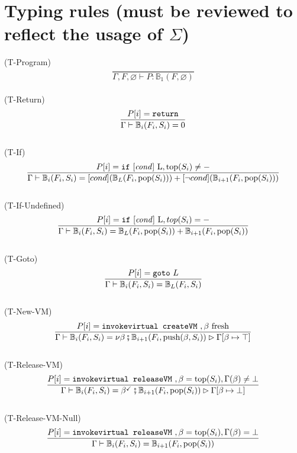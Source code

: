 \documentclass{amsart}
\newcommand{\bB}[1]{\mathbb{B}_{#1}}
\renewcommand{\emptyset}{\varnothing}
\numberwithin{equation}{section}
\theoremstyle{plain} %
\theoremstyle{definition}
\theoremstyle{remark}
\begin{document}
\section{Typing rules (must be reviewed to reflect the usage of $\Sigma$)}
(T-Program)
\begin{equation*}
\frac{}
{\Gamma, F,\emptyset \vdash P: \bB{1}(F, \emptyset)}
\end{equation*}
\\
(T-Return)
\begin{equation*}
\frac{P[i] = \text{\texttt{return}}}
{\Gamma \vdash \bB{i}(F_i, S_i) = 0}
\end{equation*}
\\
(T-If)
\begin{equation*}\frac{P[i] = \text{\texttt{if} [\emph{cond}] L}, \text{top}(S_i) \neq -}
{\Gamma \vdash \bB{i}(F_i, S_i) = [cond] (\bB{L}(F_i, \text{pop}(S_i))) +
 [\neg cond] (\bB{i+1}(F_i, \text{pop}(S_i)))}
\end{equation*}
\\
(T-If-Undefined)
\begin{equation*}\frac{P[i] = \text{\texttt{if} [\emph{cond}] L}, top(S_i) = -}
{\Gamma \vdash \bB{i}(F_i, S_i) = \bB{L}(F_i, \text{pop}(S_i)) + \bB{i+1}(F_i, \text{pop}(S_i))}
\end{equation*}
\\
(T-Goto)
\begin{equation*}
\frac{P[i] = \text{\texttt{goto} $L$}}
{\Gamma \vdash \bB{i}(F_i, S_i) = \bB{L}(F_i, S_i)}
\end{equation*}
\\
(T-New-VM)
\begin{equation*}\frac{
P[i] = \text{\texttt{invokevirtual createVM} }, \beta \text{ fresh}}
{\Gamma \vdash \bB{i}(F_i, S_i) = \nu \beta \fatsemi \bB{i+1}(F_i, \text{push}(\beta,S_i)) \rhd \Gamma[\beta \mapsto \top]}
\end{equation*}
\\
(T-Release-VM)
\begin{equation*}
\frac{P[i] = \text{\texttt{invokevirtual releaseVM} }, \beta = \text{top}(S_i), \Gamma(\beta) \neq \bot}
{\Gamma \vdash \bB{i}(F_i, S_i) = \beta^{\checkmark} \fatsemi \bB{i+1}(F_i, \text{pop}(S_i)) \rhd \Gamma[\beta \mapsto \bot]}
\end{equation*}
\\
(T-Release-VM-Null)
\begin{equation*}
\frac{P[i] = \text{\texttt{invokevirtual releaseVM} }, \beta = \text{top}(S_i), \Gamma(\beta) = \bot}
{\Gamma \vdash \bB{i}(F_i, S_i) = \bB{i+1}(F_i, \text{pop}(S_i))}
\end{equation*}
\end{document}
